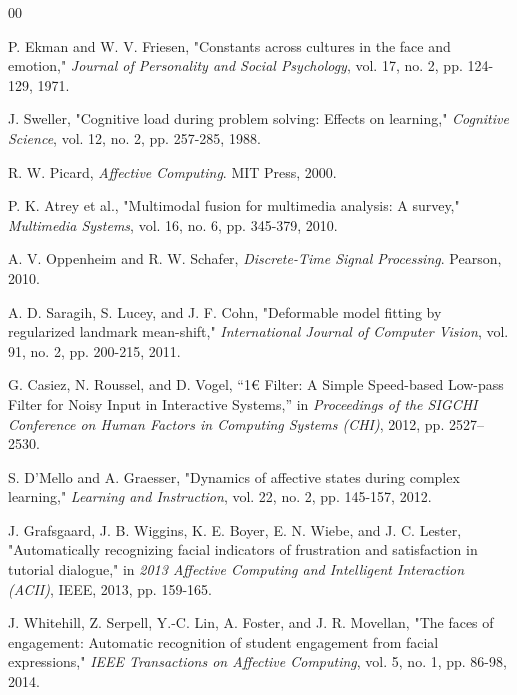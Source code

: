 \documentclass[conference]{IEEEtran}
\begin{document}
\begin{thebibliography}{00}

 P. Ekman and W. V. Friesen, "Constants across cultures in the face and emotion," \textit{Journal of Personality and Social Psychology}, vol. 17, no. 2, pp. 124-129, 1971.

 J. Sweller, "Cognitive load during problem solving: Effects on learning," \textit{Cognitive Science}, vol. 12, no. 2, pp. 257-285, 1988.

 R. W. Picard, \textit{Affective Computing}. MIT Press, 2000.

 P. K. Atrey et al., "Multimodal fusion for multimedia analysis: A survey," \textit{Multimedia Systems}, vol. 16, no. 6, pp. 345-379, 2010.


 A. V. Oppenheim and R. W. Schafer, \textit{Discrete-Time Signal Processing}. Pearson, 2010.

 A. D. Saragih, S. Lucey, and J. F. Cohn, "Deformable model fitting by regularized landmark mean-shift," \textit{International Journal of Computer Vision}, vol. 91, no. 2, pp. 200-215, 2011.


 G. Casiez, N. Roussel, and D. Vogel, ``1€ Filter: A Simple Speed-based Low-pass Filter for Noisy Input in Interactive Systems,'' in \textit{Proceedings of the SIGCHI Conference on Human Factors in Computing Systems (CHI)}, 2012, pp. 2527--2530.


 S. D'Mello and A. Graesser, "Dynamics of affective states during complex learning," \textit{Learning and Instruction}, vol. 22, no. 2, pp. 145-157, 2012.

 J. Grafsgaard, J. B. Wiggins, K. E. Boyer, E. N. Wiebe, and J. C. Lester, "Automatically recognizing facial indicators of frustration and satisfaction in tutorial dialogue," in \textit{2013 Affective Computing and Intelligent Interaction (ACII)}, IEEE, 2013, pp. 159-165.

 J. Whitehill, Z. Serpell, Y.-C. Lin, A. Foster, and J. R. Movellan, "The faces of engagement: Automatic recognition of student engagement from facial expressions," \textit{IEEE Transactions on Affective Computing}, vol. 5, no. 1, pp. 86-98, 2014.


\end{thebibliography}
\end{document}
